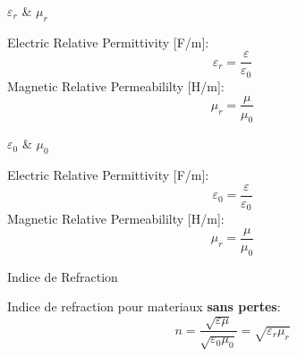 \begin{frame}{$\varepsilon_r$ \& $\mu_r$}
    \begin{twocolumns}[0.5]
        \leftcol
            Electric Relative Permittivity [F/m]:
            \begin{equation}
                \varepsilon_r =\frac{\varepsilon}{\varepsilon_0}
            \end{equation}
            Magnetic Relative Permeabililty [H/m]:
            \begin{equation}
                \mu_r =\frac{\mu}{\mu_0}
            \end{equation}
        \rightcol
    \end{twocolumns}
\end{frame}

\begin{frame}{$\varepsilon_0$ \& $\mu_0$}
    \begin{twocolumns}[0.5]
        \leftcol
            Electric Relative Permittivity [F/m]:
            \begin{equation}
                \varepsilon_0 =\frac{\varepsilon}{\varepsilon_0}
            \end{equation}
            Magnetic Relative Permeabililty [H/m]:
            \begin{equation}
                \mu_r =\frac{\mu}{\mu_0}
            \end{equation}
        \rightcol
    \end{twocolumns}
\end{frame}

\begin{frame}{Indice de Refraction}
    \begin{twocolumns}[0.5]
        \leftcol
            Indice de refraction pour materiaux \textbf{sans pertes}:
            \begin{equation}
                n =\frac{\sqrt{\varepsilon \mu}}{\sqrt{\varepsilon_0 \mu_0}} = \sqrt{\varepsilon_r \mu_r}
            \end{equation}
        \rightcol
    \end{twocolumns}
\end{frame}


